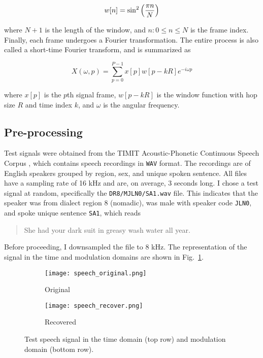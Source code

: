 \begin{equation}
\label{eq:hann-window}
w[n] = \sin^2\qty(\frac{\pi n}{N})
\end{equation}

\noindent where $N + 1$ is the length of the window, and $n: 0 \leq n \leq N$ is the frame index. Finally, each frame undergoes a Fourier transformation. The entire process is also called a short-time Fourier transform, and is summarized as

\begin{equation}
\label{eq:stft}
X(\omega, p) = \sum_{p=0}^{P-1} x[p] w[p - kR] e^{-i\omega p}
\end{equation}

\noindent where $x[p]$ is the $p$th signal frame, $w[p - kR]$ is the window function with hop size $R$ and time index $k$, and $\omega$ is the angular frequency.

\subsection{Pre-processing}
\label{ssec:audio-speech-preprocess}
Test signals were obtained from the TIMIT Acoustic-Phonetic Continuous Speech Corpus \cite{timit}, which contains speech recordings in \texttt{WAV} format. The recordings are of English speakers grouped by region, sex, and unique spoken sentence. All files have a sampling rate of 16 kHz and are, on average, 3 seconds long. I chose a test signal at random, specifically the \texttt{DR8/MJLN0/SA1.wav} file. This indicates that the speaker was from dialect region 8 (nomadic), was male with speaker code \texttt{JLN0}, and spoke unique sentence \texttt{SA1}, which reads

\begin{quotation}
	She had your dark suit in greasy wash water all year.
\end{quotation}

Before proceeding, I downsampled the file to 8 kHz. The representation of the signal in the time and modulation domains are shown in Fig.~\ref{fig:speech-original}.

\begin{figure}[htb]
	\centering
	\begin{subfigure}{0.49\textwidth}
		\centering
		\texttt{[image: speech\_original.png]}
		\caption{Original}
		\label{fig:speech-original}
	\end{subfigure}
	\begin{subfigure}{0.49\textwidth}
		\centering
		\texttt{[image: speech\_recover.png]}
		\caption{Recovered}
		\label{fig:speech-recovered}
	\end{subfigure}
	\caption{Test speech signal in the time domain (top row) and modulation domain (bottom row).}
	\label{fig:speech}
\end{figure}

